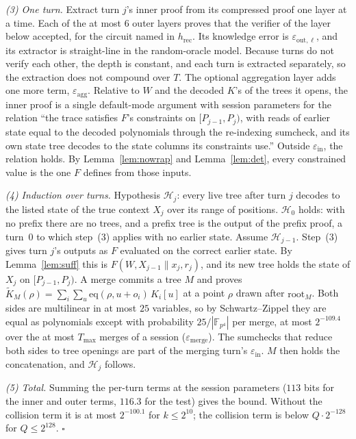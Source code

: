 \documentclass[11pt]{article}
\newcommand{\F}{\mathbb{F}}
\newcommand{\Fq}{\F_{p^4}}
\begin{document}
\emph{(3) One turn.} Extract turn \(j\)'s inner proof from its compressed proof one layer at a time.
Each of the at most \(6\) outer layers proves that the verifier of the layer below accepted, for the circuit named in \(h_{\mathrm{rec}}\).
Its knowledge error is \(\varepsilon_{\mathrm{out},\ell}\), and its extractor is straight-line in the random-oracle model.
Because turns do not verify each other, the depth is constant, and each turn is extracted separately, so the extraction does not compound over \(T\).
The optional aggregation layer adds one more term, \(\varepsilon_{\mathrm{agg}}\).
Relative to \(W\) and the decoded \(K\)'s of the trees it opens, the inner proof is a single default-mode argument with session parameters for the relation ``the trace satisfies \(F\)'s constraints on \([P_{j-1}, P_j)\), with reads of earlier state equal to the decoded polynomials through the re-indexing sumcheck, and its own state tree decodes to the state columns its constraints use.''
Outside \(\varepsilon_{\mathrm{in}}\), the relation holds.
By Lemma~\ref{lem:nowrap} and Lemma~\ref{lem:det}, every constrained value is the one \(F\) defines from those inputs.

\emph{(4) Induction over turns.} Hypothesis \(\mathcal{H}_j\): every live tree after turn \(j\) decodes to the listed state of the true context \(X_j\) over its range of positions.
\(\mathcal{H}_0\) holds: with no prefix there are no trees, and a prefix tree is the output of the prefix proof, a turn~\(0\) to which step~(3) applies with no earlier state.
Assume \(\mathcal{H}_{j-1}\).
Step~(3) gives turn \(j\)'s outputs as \(F\) evaluated on the correct earlier state.
By Lemma~\ref{lem:suff} this is \(F(W, X_{j-1} \| x_j, r_j)\), and its new tree holds the state of \(X_j\) on \([P_{j-1}, P_j)\).
A merge commits a tree \(M\) and proves \(\tilde K_M(\rho) = \sum_i \sum_{u} \mathrm{eq}(\rho, u + o_i)\, K_i[u]\) at a point \(\rho\) drawn after \(\mathrm{root}_M\).
Both sides are multilinear in at most \(25\) variables, so by Schwartz--Zippel they are equal as polynomials except with probability \(25/|\Fq|\) per merge, at most \(2^{-109.4}\) over the at most \(T_{\max}\) merges of a session (\(\varepsilon_{\mathrm{merge}}\)).
The sumchecks that reduce both sides to tree openings are part of the merging turn's \(\varepsilon_{\mathrm{in}}\).
\(M\) then holds the concatenation, and \(\mathcal{H}_j\) follows.

\emph{(5) Total.} Summing the per-turn terms at the session parameters (\(113\) bits for the inner and outer terms, \(116.3\) for the test) gives the bound. Without the collision term it is at most \(2^{-100.1}\) for \(k \le 2^{10}\); the collision term is below \(Q \cdot 2^{-128}\) for \(Q \le 2^{128}\). \(\square\)
\end{document}
